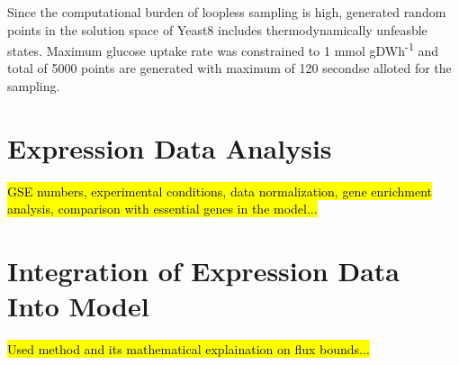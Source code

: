 Since the computational burden of loopless sampling is high, generated random points in the solution space of Yeast8 includes thermodynamically unfeasble states. Maximum glucose uptake rate was constrained to 1 mmol gDWh\textsuperscript{-1} and total of 5000 points are generated with maximum of 120 secondse alloted for the sampling.

\section{Expression Data Analysis}
\hl{GSE numbers, experimental conditions, data normalization, gene enrichment analysis, comparison with essential genes in the model...}
\section{Integration of Expression Data Into Model}
\hl{Used method and its mathematical explaination on flux bounds...}
